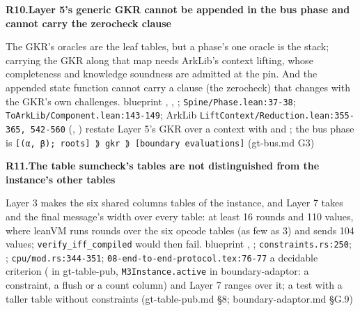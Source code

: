 \par\medskip\noindent\textbf{R10.}\enspace\textbf{Layer 5's generic GKR cannot be appended in the bus phase and cannot carry the zerocheck clause}\par\nopagebreak
{} The GKR's oracles are the leaf tables, but a phase's one oracle is the stack; carrying the GKR along that map needs ArkLib's context lifting, whose completeness and knowledge soundness are admitted at the pin. And the appended state function cannot carry a clause (the zerocheck) that changes with the GKR's own challenges.
 blueprint , , ; \texttt{Spine/\allowbreak{}Phase.\allowbreak{}lean:\allowbreak{}37-\allowbreak{}38}; \texttt{To\allowbreak{}Ark\allowbreak{}Lib/\allowbreak{}Component.\allowbreak{}lean:\allowbreak{}143-\allowbreak{}149}; ArkLib \texttt{Lift\allowbreak{}Context/\allowbreak{}Reduction.\allowbreak{}lean:\allowbreak{}355-\allowbreak{}365,\allowbreak{} 542-\allowbreak{}560} (, )
 restate Layer 5's GKR over a context with  and ; the bus phase is \texttt{[(\allowbreak{}α,\allowbreak{} β); roots] ⟫ gkr ⟫ [boundary evaluations]} (gt-bus.md G3)

\par\medskip\noindent\textbf{R11.}\enspace\textbf{The table sumcheck's tables are not distinguished from the instance's other tables}\par\nopagebreak
{} Layer 3 makes the six shared columns tables of the instance, and Layer 7 takes  and the final message's width over every table: at least 16 rounds and 110 values, where leanVM runs  rounds over the six opcode tables (as few as 3) and sends 104 values; \texttt{verify\_\allowbreak{}iff\_\allowbreak{}compiled} would then fail.
 blueprint , ; \texttt{constraints.\allowbreak{}rs:\allowbreak{}250}; ; \texttt{cpu/\allowbreak{}mod.\allowbreak{}rs:\allowbreak{}344-\allowbreak{}351}; \texttt{08-\allowbreak{}end-\allowbreak{}to-\allowbreak{}end-\allowbreak{}protocol.\allowbreak{}tex:\allowbreak{}76-\allowbreak{}77}
 a decidable criterion ( in gt-table-pub, \texttt{M3Instance.\allowbreak{}active} in boundary-adaptor: a constraint, a flush or a count column) and Layer 7 ranges over it; a test with a taller table without constraints (gt-table-pub.md §8; boundary-adaptor.md §G.9)

